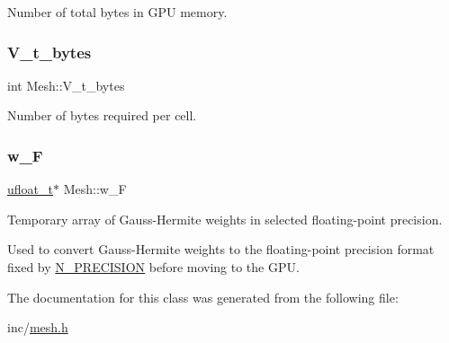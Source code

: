 Number of total bytes in G\+PU memory. 

\mbox{\label{classMesh_a6023095ae0a26750d9a37039a3963e43}} 
\subsubsection{\texorpdfstring{V\+\_\+t\+\_\+bytes}{V\_t\_bytes}}
{\footnotesize\ttfamily int Mesh\+::\+V\+\_\+t\+\_\+bytes}



Number of bytes required per cell. 

\mbox{\label{classMesh_a02cfbbadd6a7c556018e7c4503d18128}} 
\subsubsection{\texorpdfstring{w\+\_\+F}{w\_F}}
{\footnotesize\ttfamily \hyperlink{cppspec_8h_af529d360dfac9b9578aa719418a53a21}{ufloat\+\_\+t}$\ast$ Mesh\+::w\+\_\+F}



Temporary array of Gauss-\/\+Hermite weights in selected floating-\/point precision. 

Used to convert Gauss-\/\+Hermite weights to the floating-\/point precision format fixed by \hyperlink{cppspec_8h_a471e2491cf3df4197fe5b39387103e8e}{N\+\_\+\+P\+R\+E\+C\+I\+S\+I\+ON} before moving to the G\+PU. 

The documentation for this class was generated from the following file\+:\begin{DoxyCompactItemize}
\item 
inc/\hyperlink{mesh_8h}{mesh.\+h}\end{DoxyCompactItemize}
